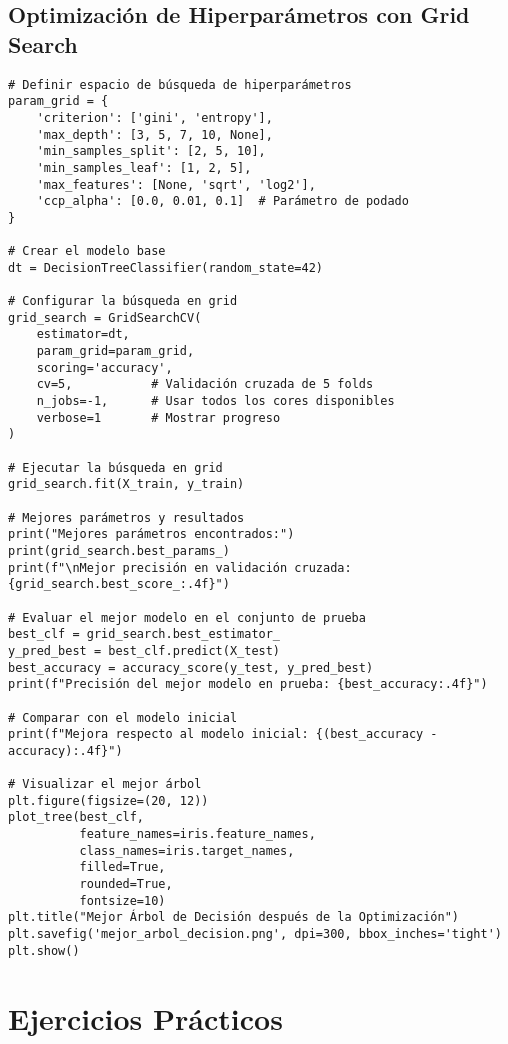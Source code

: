 \documentclass[12pt]{article}
\begin{document}
\subsection{Optimización de Hiperparámetros con Grid Search}
\begin{lstlisting}
# Definir espacio de búsqueda de hiperparámetros
param_grid = {
    'criterion': ['gini', 'entropy'],
    'max_depth': [3, 5, 7, 10, None],
    'min_samples_split': [2, 5, 10],
    'min_samples_leaf': [1, 2, 5],
    'max_features': [None, 'sqrt', 'log2'],
    'ccp_alpha': [0.0, 0.01, 0.1]  # Parámetro de podado
}

# Crear el modelo base
dt = DecisionTreeClassifier(random_state=42)

# Configurar la búsqueda en grid
grid_search = GridSearchCV(
    estimator=dt,
    param_grid=param_grid,
    scoring='accuracy',
    cv=5,           # Validación cruzada de 5 folds
    n_jobs=-1,      # Usar todos los cores disponibles
    verbose=1       # Mostrar progreso
)

# Ejecutar la búsqueda en grid
grid_search.fit(X_train, y_train)

# Mejores parámetros y resultados
print("Mejores parámetros encontrados:")
print(grid_search.best_params_)
print(f"\nMejor precisión en validación cruzada: {grid_search.best_score_:.4f}")

# Evaluar el mejor modelo en el conjunto de prueba
best_clf = grid_search.best_estimator_
y_pred_best = best_clf.predict(X_test)
best_accuracy = accuracy_score(y_test, y_pred_best)
print(f"Precisión del mejor modelo en prueba: {best_accuracy:.4f}")

# Comparar con el modelo inicial
print(f"Mejora respecto al modelo inicial: {(best_accuracy - accuracy):.4f}")

# Visualizar el mejor árbol
plt.figure(figsize=(20, 12))
plot_tree(best_clf, 
          feature_names=iris.feature_names, 
          class_names=iris.target_names, 
          filled=True, 
          rounded=True, 
          fontsize=10)
plt.title("Mejor Árbol de Decisión después de la Optimización")
plt.savefig('mejor_arbol_decision.png', dpi=300, bbox_inches='tight')
plt.show()
\end{lstlisting}

\section{Ejercicios Prácticos}
\end{document}
